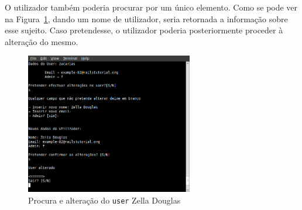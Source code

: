 O utilizador também poderia procurar por um único elemento. Como se pode ver na Figura~\ref{img:zelladouglas}, dando um nome de utilizador, 
seria retornada a informação sobre esse sujeito. Caso pretendesse, o utilizador poderia posteriormente proceder à alteração do mesmo.\\

\begin{figure}[H]
\begin{center}
\includegraphics[width=0.65\textwidth]{Images/zacarias}
\caption{Procura e alteração do \texttt{user} Zella Douglas}\label{img:zelladouglas}
\end{center}
\end{figure} 
